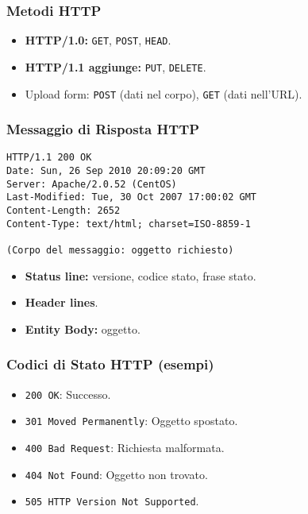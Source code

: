 \subsubsection{Metodi HTTP}
\begin{itemize}
    \item \textbf{HTTP/1.0:} \texttt{GET}, \texttt{POST}, \texttt{HEAD}.
    \item \textbf{HTTP/1.1 aggiunge:} \texttt{PUT}, \texttt{DELETE}.
    \item Upload form: \texttt{POST} (dati nel corpo), \texttt{GET} (dati nell'URL).
\end{itemize}

\subsubsection{Messaggio di Risposta HTTP}
\begin{verbatim}
HTTP/1.1 200 OK
Date: Sun, 26 Sep 2010 20:09:20 GMT
Server: Apache/2.0.52 (CentOS)
Last-Modified: Tue, 30 Oct 2007 17:00:02 GMT
Content-Length: 2652
Content-Type: text/html; charset=ISO-8859-1

(Corpo del messaggio: oggetto richiesto)
\end{verbatim}
\begin{itemize}
    \item \textbf{Status line:} versione, codice stato, frase stato.
    \item \textbf{Header lines}.
    \item \textbf{Entity Body:} oggetto.
\end{itemize}

\subsubsection{Codici di Stato HTTP (esempi)}
\begin{itemize}
    \item \texttt{200 OK}: Successo.
    \item \texttt{301 Moved Permanently}: Oggetto spostato.
    \item \texttt{400 Bad Request}: Richiesta malformata.
    \item \texttt{404 Not Found}: Oggetto non trovato.
    \item \texttt{505 HTTP Version Not Supported}.
\end{itemize}

